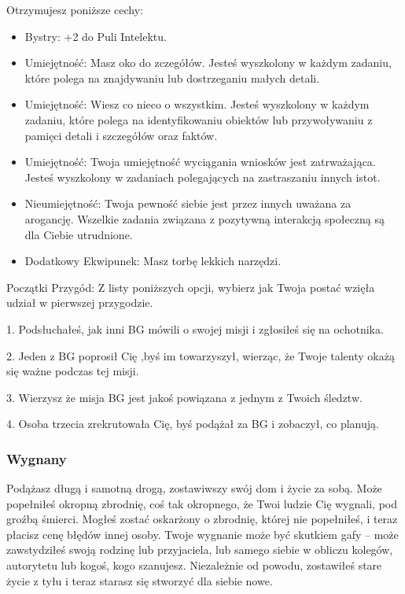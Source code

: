 Otrzymujesz poniższe cechy:
\begin{itemize}
    \item  Bystry: +2 do Puli Intelektu.
    \item  Umiejętność: Masz oko do zczegółów. Jesteś wyszkolony w każdym zadaniu, które polega na znajdywaniu lub dostrzeganiu małych detali.
    \item  Umiejętność: Wiesz co nieco o wszystkim. Jesteś wyszkolony w każdym zadaniu, które polega na identyfikowaniu obiektów lub przywoływaniu z pamięci detali i szczegółów oraz faktów.
    \item  Umiejętność: Twoja umiejętność wyciągania wniosków jest zatrważająca. Jesteś wyszkolony w zadaniach polegających na zastraszaniu innych istot.
    \item  Nieumiejętność: Twoja pewność siebie jest przez innych uważana za arogancję. Wszelkie zadania związana z pozytywną interakcją społeczną są dla Ciebie utrudnione.
    \item  Dodatkowy Ekwipunek: Masz torbę lekkich narzędzi.
\end{itemize}

Początki Przygód: Z listy poniższych opcji, wybierz jak Twoja postać wzięła udział w pierwszej przygodzie.

1. Podsłuchałeś, jak inni BG mówili o swojej misji i zgłosiłeś się na ochotnika.

2. Jeden z BG poprosił Cię ,byś im towarzyszył, wierząc, że Twoje talenty okażą się ważne podczas tej misji. 

3. Wierzysz że misja BG jest jakoś powiązana z jednym z Twoich śledztw.

4. Osoba trzecia zrekrutowała Cię, byś podążał za BG i zobaczył, co planują.

\subsubsection{Wygnany}

Podążasz długą i samotną drogą, zostawiwszy swój dom i życie za sobą. Może popełniłeś okropną zbrodnię, coś tak okropnego, że Twoi ludzie Cię wygnali, pod groźbą śmierci. Mogłeś zostać oskarżony o zbrodnię, której nie popełniłeś, i teraz płacisz cenę błędów innej osoby. Twoje wygnanie może być skutkiem gafy – może zawstydziłeś swoją rodzinę lub przyjaciela, lub samego siebie w obliczu kolegów, autorytetu lub kogoś, kogo szanujesz. Niezależnie od powodu, zostawiłeś stare życie z tyłu i teraz starasz się stworzyć dla siebie nowe.

